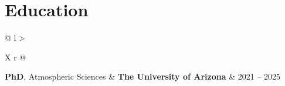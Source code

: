 \documentclass[margin,line]{resume}
\begin{document}
\begin{resume}
{		}
		
		\vspace*{-3mm}
		
		
		
		
		\section{\mysidestyle \textbf{\textcolor{sep}{Education}}}
		\begin{tabularx}{\linewidth}{@{} l >{\raggedright\arraybackslash}X r @{}}
			\textbf{PhD}, Atmospheric Sciences & \textbf{The University of Arizona} & 2021 -- 2025 \\
			 \\[1.5ex]
			

\end{tabularx}
\end{resume}
\end{document}
